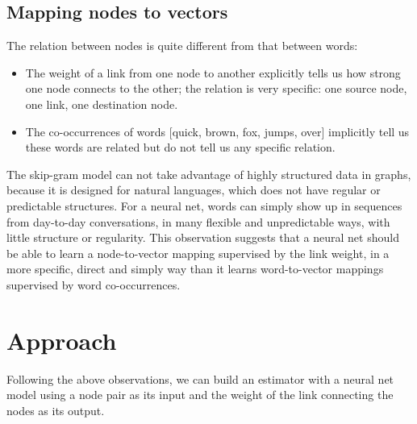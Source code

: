 \documentclass[conference]{IEEEtran}
\begin{document}
\subsection{Mapping nodes to vectors}
The relation between nodes is quite different from that between words:
\begin{itemize}
	\item The weight of a link from one node to another explicitly tells us
	how strong one node connects to the other;
	the relation is very specific: one source node, one link, one destination node.
	\item The co-occurrences of words [quick, brown, fox, jumps, over] 
	implicitly tell us these words are related but do not tell us any 
	specific relation.
\end{itemize}
The skip-gram model can not take advantage of highly structured data in graphs,
because it is designed for natural languages,
which does not have regular or predictable structures.
For a neural net, 
words can simply show up in sequences from day-to-day conversations,
in many flexible and unpredictable ways, with little structure or regularity.
This observation suggests that a neural net should be able to learn a 
node-to-vector mapping supervised by the link weight,
in a more specific, direct and simply way than it learns word-to-vector 
mappings supervised by word co-occurrences.

\section{Approach}
Following the above observations,
we can build an estimator with a neural net model
using a node pair as its input
and the weight of the link connecting the nodes as its output.
\end{document}

